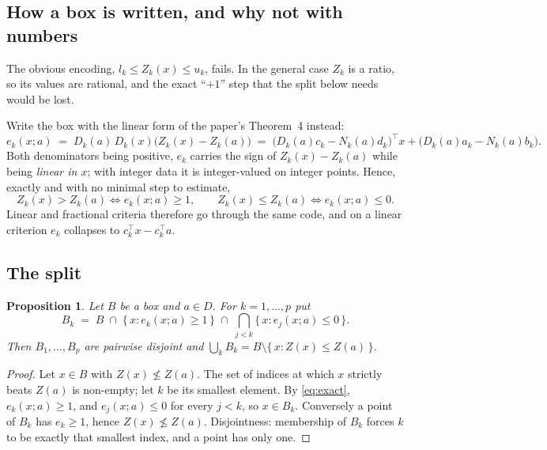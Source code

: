 \documentclass[11pt,a4paper]{article}
\newtheorem{proposition}{Proposition}
\newcommand{\Z}{Z}
\newcommand{\Dset}{D}
\begin{document}
\subsection{How a box is written, and why not with numbers}

The obvious encoding, $l_k \leqslant \Z_k(x) \leqslant u_k$, fails. In the
general case $\Z_k$ is a ratio, so its values are rational, and the exact
``$+1$'' step that the split below needs would be lost.

Write the box with the linear form of the paper's Theorem~4 instead:
\begin{equation}\label{eq:e}
  e_k(x;a) \;=\; D_k(a)\, D_k(x) \bigl( \Z_k(x) - \Z_k(a) \bigr)
  \;=\; \bigl(D_k(a) c_k - N_k(a) d_k\bigr)^{\top} x
      + \bigl(D_k(a) a_k - N_k(a) b_k\bigr).
\end{equation}
Both denominators being positive, $e_k$ carries the sign of
$\Z_k(x) - \Z_k(a)$ while being \emph{linear in $x$}; with integer data it is
integer-valued on integer points. Hence, exactly and with no minimal step to
estimate,
\begin{equation}\label{eq:exact}
  \Z_k(x) > \Z_k(a) \iff e_k(x;a) \geqslant 1,
  \qquad
  \Z_k(x) \leqslant \Z_k(a) \iff e_k(x;a) \leqslant 0 .
\end{equation}
Linear and fractional criteria therefore go through the same code, and on a
linear criterion $e_k$ collapses to $c_k^{\top}x - c_k^{\top}a$.

\subsection{The split}

\begin{proposition}\label{prop:split}
Let $B$ be a box and $a \in \Dset$. For $k = 1,\dots,p$ put
\begin{equation}\label{eq:child}
  B_k \;=\; B \;\cap\; \{\, x : e_k(x;a) \geqslant 1 \,\}
            \;\cap\; \bigcap_{j<k} \{\, x : e_j(x;a) \leqslant 0 \,\} .
\end{equation}
Then $B_1,\dots,B_p$ are pairwise disjoint and
$\bigcup_k B_k = B \setminus \{\, x : \Z(x) \leqslant \Z(a) \,\}$.
\end{proposition}

\begin{proof}
Let $x \in B$ with $\Z(x) \not\leqslant \Z(a)$. The set of indices at which $x$
strictly beats $\Z(a)$ is non-empty; let $k$ be its smallest element. By
\eqref{eq:exact}, $e_k(x;a) \geqslant 1$, and $e_j(x;a) \leqslant 0$ for every
$j < k$, so $x \in B_k$. Conversely a point of $B_k$ has
$e_k \geqslant 1$, hence $\Z(x) \not\leqslant \Z(a)$. Disjointness: membership
of $B_k$ forces $k$ to be exactly that smallest index, and a point has only
one.
\end{proof}
\end{document}
